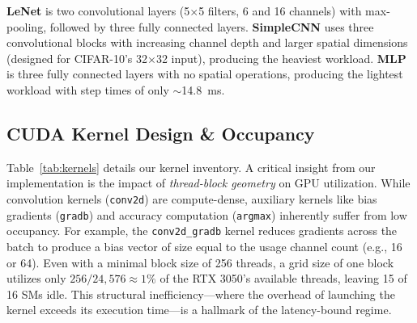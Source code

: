 \documentclass[10pt,twocolumn,letterpaper]{article}
\begin{document}
\textbf{LeNet} is two convolutional layers (5$\times$5 filters, 6 and 16 channels) with max-pooling, followed by three fully connected layers.
\textbf{SimpleCNN} uses three convolutional blocks with increasing channel depth and larger spatial dimensions (designed for CIFAR-10's 32$\times$32 input), producing the heaviest workload.
\textbf{MLP} is three fully connected layers with no spatial operations, producing the lightest workload with step times of only $\sim$14.8~ms.

\subsection{CUDA Kernel Design \& Occupancy}

Table~\ref{tab:kernels} details our kernel inventory. A critical insight from our implementation is the impact of \emph{thread-block geometry} on GPU utilization.
While convolution kernels (\texttt{conv2d}) are compute-dense, auxiliary kernels like bias gradients (\texttt{gradb}) and accuracy computation (\texttt{argmax}) inherently suffer from low occupancy.
For example, the \texttt{conv2d\_gradb} kernel reduces gradients across the batch to produce a bias vector of size equal to the usage channel count (e.g., 16 or 64). Even with a minimal block size of 256 threads, a grid size of one block utilizes only $256 / 24,576 \approx 1\%$ of the RTX 3050's available threads, leaving 15 of 16 SMs idle. This structural inefficiency---where the overhead of launching the kernel exceeds its execution time---is a hallmark of the latency-bound regime.
\end{document}

